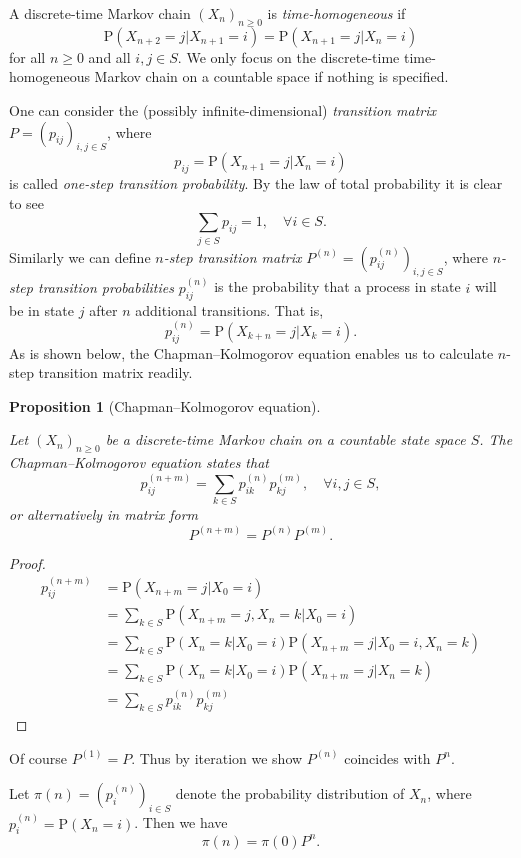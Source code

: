 \documentclass{report}
\newtheorem{proposition}{Proposition}[section]
\theoremstyle{nonumberplain}
\newtheorem{proof}{Proof.}
\begin{document}
\noindent A discrete-time Markov chain $(X_n)_{n\ge0}$ is \emph{time-homogeneous} if
\[
\mathrm{P}(X_{n+2}=j| X_{n+1}=i)=\mathrm{P}(X_{n+1}=j| X_{n}=i)
\]
for all $n\ge0$ and all $i,j\in S$. We only focus on the discrete-time time-homogeneous Markov chain on a countable space if nothing is specified. 

\noindent One can consider the (possibly infinite-dimensional) \emph{transition matrix}	$P=(p_{ij})_{i,j\in S}$, where
\[
p_{ij}=\mathrm{P}(X_{n+1}=j| X_{n}=i)
\]
is called \emph{one-step transition probability}. By the law of total probability it is clear to see 
\[
\sum_{j\in S}p_{ij}=1,\quad\forall i\in S.
\]
Similarly we can define \emph{$n$-step transition matrix} $P^{(n)}=\left(p^{(n)}_{ij}\right)_{i,j\in S}$, where \emph{$n$-step transition probabilities} $p^{(n)}_{ij}$ is the probability that a process in state $i$ will be in state $j$ after $n$ additional transitions. That is,
\[
p^{(n)}_{ij}=\mathrm{P}(X_{k+n}=j| X_{k}=i).
\]
As is shown below, the Chapman–Kolmogorov equation enables us to calculate $n$-step transition matrix readily.
\begin{proposition}[Chapman–Kolmogorov equation]\hypertarget{Proposition 4.1}{}
Let $(X_n)_{n\ge0}$ be a discrete-time Markov chain on a countable state space $S$. The \emph{Chapman–Kolmogorov equation} states that
\[
p^{(n+m)}_{ij}=\sum_{k\in S}p^{(n)}_{ik}p^{(m)}_{kj},\quad\forall i,j\in S,
\]
or alternatively in matrix form
\[
P^{(n+m)}=P^{(n)}P^{(m)}.
\]
\end{proposition}
\begin{proof}
	\[
	\begin{aligned}
		p^{(n+m)}_{ij}&=\mathrm{P}(X_{n+m}=j| X_{0}=i)\\
		&=\sum_{k\in S}\mathrm{P}(X_{n+m}=j,X_{n}=k| X_{0}=i)\\
		&=\sum_{k\in S}\mathrm{P}(X_{n}=k| X_{0}=i)\mathrm{P}(X_{n+m}=j| X_{0}=i,X_{n}=k)\\
		&=\sum_{k\in S}\mathrm{P}(X_{n}=k| X_{0}=i)\mathrm{P}(X_{n+m}=j| X_{n}=k)\\
		&=\sum_{k\in S}p^{(n)}_{ik}p^{(m)}_{kj}
	\end{aligned}
	\]
\end{proof}
\noindent Of course $P^{(1)}=P$. Thus by iteration we show $P^{(n)}$ coincides with $P^n$. 

\noindent Let $\pi(n)=\left(p_i^{(n)}\right)_{i\in S}$ denote the probability distribution of $X_n$, where $p_i^{(n)}=\mathrm{P}(X_n=i)$. Then we have
\[
\pi(n)=\pi(0)P^n.
\]
\end{document}
